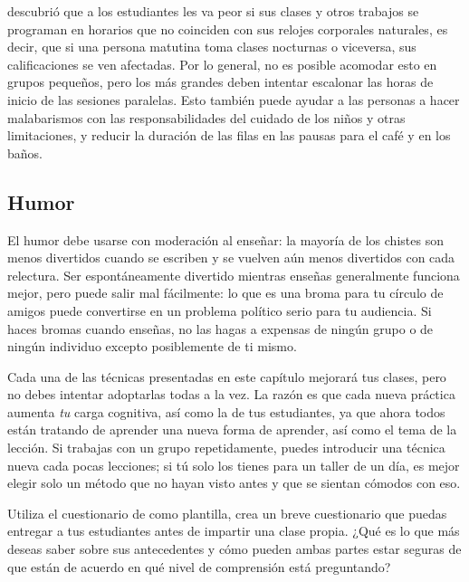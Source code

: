 \cite{Smar2018} descubrió que
a los estudiantes les va peor
si sus clases y otros trabajos se programan en horarios que no coinciden con sus relojes corporales naturales,
es decir, que si una persona matutina toma clases nocturnas o viceversa,
sus calificaciones se ven afectadas.
Por lo general, no es posible acomodar esto en grupos pequeños,
pero los más grandes deben intentar escalonar las horas de inicio de las sesiones paralelas.
Esto también puede ayudar a las personas a hacer malabarismos con las responsabilidades del cuidado de los niños y otras limitaciones,
y reducir la duración de las filas en las pausas para el café y en los baños.

\subsection*{Humor}

El humor debe usarse con moderación al enseñar:
la mayoría de los chistes son menos divertidos cuando se escriben
y se vuelven aún menos divertidos con cada relectura.
Ser espontáneamente divertido mientras enseñas generalmente funciona mejor,
pero puede salir mal fácilmente:
lo que es una broma para tu círculo de amigos
puede convertirse en un problema político serio para tu audiencia.
Si haces bromas cuando enseñas,
no las hagas a expensas de ningún grupo
o de ningún individuo excepto posiblemente de ti mismo.


Cada una de las técnicas presentadas en este capítulo mejorará tus clases,
pero no debes intentar adoptarlas todas a la vez.
La razón es que cada nueva práctica aumenta \emph{tu} carga cognitiva, así como la de tus estudiantes,
ya que ahora todos están tratando de aprender una nueva forma de aprender,
así como el tema de la lección.
Si trabajas con un grupo repetidamente,
puedes introducir una técnica nueva cada pocas lecciones;
si tú solo los tienes para un taller de un día,
es mejor elegir solo un método que no hayan visto antes
y que se sientan cómodos con eso.



Utiliza el cuestionario de  como plantilla,
crea un breve cuestionario que puedas entregar a tus estudiantes antes de impartir una clase propia.
¿Qué es lo que más deseas saber sobre sus antecedentes
y cómo pueden ambas partes estar seguras de que están de acuerdo en qué nivel de comprensión está preguntando?

